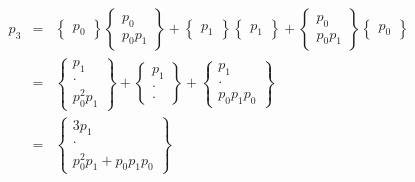 \documentclass[a4paper,12pt]{article}
\numberwithin{definition}{section}
\numberwithin{lemma}{section}
\numberwithin{proposition}{section}
\numberwithin{theorem}{section}
\numberwithin{grammar}{section}
\numberwithin{program}{section}
\numberwithin{convention}{section}
\numberwithin{corollary}{section}
\numberwithin{principle}{section}
\begin{document}
$$\begin{array}{lcl}
p_3 & = & \begin{Bmatrix} p_0 \end{Bmatrix} \begin{Bmatrix}  p_0 \\  p_0 p_1 \end{Bmatrix} +
          \begin{Bmatrix} p_1 \end{Bmatrix}\begin{Bmatrix} p_1 \end{Bmatrix} +
          \begin{Bmatrix} p_0 \\  p_0 p_1 \end{Bmatrix} \begin{Bmatrix} p_0 \end{Bmatrix}\\
    & = & \begin{Bmatrix} p_1 \\ \cdot \\ p_0^2 p_1 \end{Bmatrix} +
          \begin{Bmatrix} p_1 \\ \cdot \\ \cdot \end{Bmatrix} +
          \begin{Bmatrix} p_1 \\ \cdot \\ p_0 p_1 p_0 \end{Bmatrix} \\
    & = & \begin{Bmatrix} 3 p_1 \\ \cdot \\ p_0^2 p_1 + p_0 p_1 p_0 \end{Bmatrix}
\end{array}
$$
\end{document}
